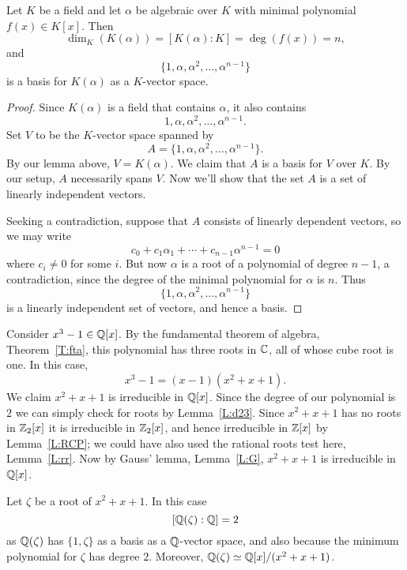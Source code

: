 \documentclass{ximera}
\begin{document}
\begin{theorem}\label{T:dae}
  Let $K$ be a field and let $\alpha$ be algebraic over $K$ with
  minimal polynomial $f(x)\in K[x]$. Then
  \[
  \dim_K(K(\alpha)) = [K(\alpha):K] = \deg(f(x)) = n,
  \]
  and
  \[
  \{1,\alpha,\alpha^2,\dots,\alpha^{n-1}\}
  \]
  is a basis for $K(\alpha)$ as a $K$-vector space.
  \begin{proof}
    Since $K(\alpha)$ is a field that contains $\alpha$, it also contains
    \[
    1, \alpha, \alpha^2, \dots, \alpha^{n-1}.
    \]
    Set $V$ to be the $K$-vector space spanned by
    \[
    A = \{1,\alpha,\alpha^2,\dots,\alpha^{n-1}\}.
    \]
    By our lemma above, $V = K(\alpha)$.  We claim that $A$ is a basis for
    $V$ over $K$. By our setup, $A$ necessarily spans $V$. Now we'll
    show that the set $A$ is a set of linearly independent vectors.

    Seeking a contradiction, suppose that $A$ consists of linearly
    dependent vectors, so we may write
    \[
    c_0 + c_1\alpha_1 + \cdots + c_{n-1}\alpha^{n-1} =0
    \]
    where $c_i\ne 0$ for some $i$. But now $\alpha$ is a root of a
    polynomial of degree $n-1$, a contradiction, since the degree of
    the minimal polynomial for $\alpha$ is $n$. Thus
    \[
    \{1,\alpha,\alpha^2,\dots,\alpha^{n-1}\}
    \]
    is a linearly independent set of vectors, and hence a basis.
  \end{proof}
\end{theorem}

\begin{example}
  Consider $x^3-1 \in \mathbb Q[x]$. By the fundamental theorem of algebra,
  Theorem~\ref{T:fta}, this polynomial has three roots in $\mathbb C$, all of
  whose cube root is one. In this case,
  \[
  x^3-1= (x-1)(x^2+x+1).
  \]
  We claim $x^2+x+1$ is irreducible in $\mathbb Q[x]$.  Since the degree of
  our polynomial is $2$ we can simply check for roots by
  Lemma~\ref{L:d23}. Since $x^2+x+1$ has no roots in $\mathbb Z_2[x]$ it is
  irreducible in $\mathbb Z_2[x]$, and hence irreducible in $\mathbb Z[x]$ by
  Lemma~\ref{L:RCP}; we could have also used the rational roots test
  here, Lemma~\ref{L:rr}. Now by Gauss' lemma, Lemma~\ref{L:G}, $x^2+x+1$ is
  irreducible in $\mathbb Q[x]$.


  Let $\zeta$ be a root of $x^2 + x +1$. In this case
  \[
  [\mathbb Q(\zeta):\mathbb Q] = 2
  \]
  as $\mathbb Q(\zeta)$ has $\{1,\zeta\}$ as a basis as a $\mathbb Q$-vector space,
  and also because the minimum polynomial for $\zeta$ has degree
  $2$. Moreover, $\mathbb Q(\zeta) \simeq \mathbb Q[x]/(x^2 + x+ 1)$.
\end{example}
\end{document}
